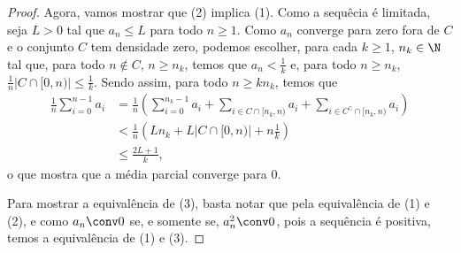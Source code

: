 \begin{proof}
Agora, vamos mostrar que (2) implica (1). Como a sequêcia é limitada, seja $L>0$ tal que $a_n \leq L$ para todo $n \geq 1$. Como $a_n$ converge para zero fora de $C$ e o conjunto $C$ tem densidade zero, podemos escolher, para cada $k \geq 1$, $n_k \in \N$ tal que, para todo $n \notin C$, $n \geq n_k$, temos que $a_n < \frac{1}{k}$ e, para todo $n \geq n_k$, $\frac{1}{n}|C \cap [0,n)| \leq \frac{1}{k}$. Sendo assim, para todo $n \geq kn_k$, temos que
	\begin{align*}
	\frac{1}{n} \sum_{i=0}^{n-1} a_i &= \frac{1}{n} \left(\sum_{i=0}^{n_k-1} a_i   +   \sum_{i \in C \cap [n_k,n)} a_i    +    \sum_{i \in C^\complement \cap [n_k,n)} a_i \right) \\
	& < \frac{1}{n} \left(Ln_k + L |C \cap [0,n)| + n\frac{1}{k}\right) \\
	& \leq \frac{2L+1}{k},
	\end{align*}
o que mostra que a média parcial converge para $0$.

 Para mostrar a equivalência de (3), basta notar que pela equivalência de (1) e (2), e como $a_n \conv 0$ se, e somente se, $a_n^2 \conv 0$, pois a sequência é positiva, temos a equivalência de (1) e (3).
\end{proof}

